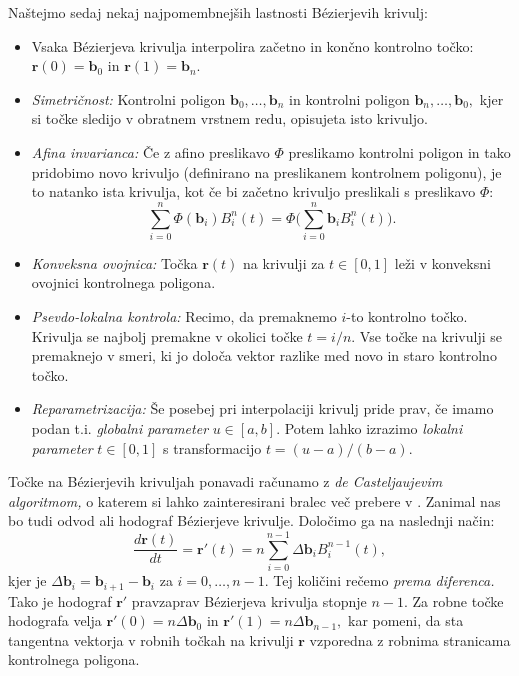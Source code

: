 \documentclass[12pt,a4paper,twoside]{article}
\theoremstyle{definition} %
\theoremstyle{plain} %
\theoremstyle{primerstyle}
\numberwithin{equation}{section}  %
\newcommand{\bV}{\mathbf{b}}
\newcommand{\rV}{\mathbf{r}}
\begin{document}
Naštejmo sedaj nekaj najpomembnejših lastnosti Bézierjevih krivulj:
\begin{itemize}
	\item Vsaka Bézierjeva krivulja interpolira začetno in končno kontrolno točko: $\rV(0)=\bV_0$ in $\rV(1)=\bV_n.$
	\item \emph{Simetričnost:} Kontrolni poligon $\bV_0,\dots,\bV_n$ in kontrolni poligon $\bV_n,\dots,\bV_0,$ kjer si točke sledijo v obratnem vrstnem redu, opisujeta isto krivuljo.
	\item \emph{Afina invarianca:} Če z afino preslikavo $\Phi$ preslikamo kontrolni poligon in tako pridobimo novo krivuljo (definirano na preslikanem kontrolnem poligonu), je to natanko ista krivulja, kot če bi začetno krivuljo preslikali s preslikavo $\Phi:$
	$$\sum_{i=0}^n\Phi(\bV_i)B_i^n(t)=\Phi\big(\sum_{i=0}^n\bV_iB_i^n(t)\big).$$
	\item \emph{Konveksna ovojnica:} Točka $\rV(t)$ na krivulji za $t\in[0,1]$ leži v konveksni ovojnici kontrolnega poligona.
	\item \emph{Psevdo-lokalna kontrola:} Recimo, da premaknemo $i$-to kontrolno točko. Krivulja se najbolj premakne v okolici točke $t=i/n.$ Vse točke na krivulji se premaknejo v smeri, ki jo določa vektor razlike med novo in staro kontrolno točko.
	\item \emph{Reparametrizacija:} Še posebej pri interpolaciji krivulj pride prav, če imamo podan t.i. \emph{globalni parameter} $u\in[a,b].$ Potem lahko izrazimo \emph{lokalni parameter} $t\in[0,1]$ s transformacijo $t=(u-a)/(b-a).$
\end{itemize}
Točke na Bézierjevih krivuljah ponavadi računamo z \emph{de Casteljaujevim algoritmom,} o katerem si lahko zainteresirani bralec več prebere v \cite{farin2002handbook}. Zanimal nas bo tudi odvod ali hodograf Bézierjeve krivulje. Določimo ga na naslednji način:
\begin{equation}
	\label{odvod_bezier}
	\frac{d\rV(t)}{dt}=\rV'(t)=n\sum_{i=0}^{n-1}\Delta\bV_iB_i^{n-1}(t),
\end{equation}
kjer je $\Delta\bV_i=\bV_{i+1}-\bV_i$ za $i=0,\dots,n-1.$ Tej količini rečemo \emph{prema diferenca.} Tako je hodograf $\rV'$ pravzaprav Bézierjeva krivulja stopnje $n-1.$ Za robne točke hodografa velja $\rV'(0)=n\Delta\bV_0$ in $\rV'(1)=n\Delta\bV_{n-1},$ kar pomeni, da sta tangentna vektorja v robnih točkah na krivulji $\rV$ vzporedna z robnima stranicama kontrolnega poligona.
\end{document}
